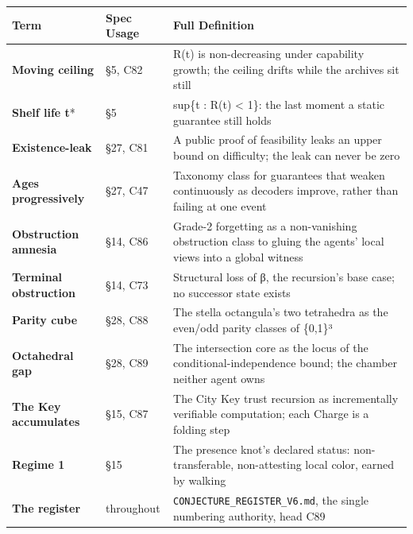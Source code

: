 \documentclass[
  11pt,
]{article}
\newcounter{none} %
\begin{document}
{\def\LTcaptype{none} %
\begin{longtable}[]{@{}
  >{\raggedright\arraybackslash}p{}
  >{\raggedright\arraybackslash}p{}
  >{\raggedright\arraybackslash}p{}@{}}
\toprule\noalign{}
\begin{minipage}[b]{\linewidth}\raggedright
Term
\end{minipage} & \begin{minipage}[b]{\linewidth}\raggedright
Spec Usage
\end{minipage} & \begin{minipage}[b]{\linewidth}\raggedright
Full Definition
\end{minipage} \\
\midrule\noalign{}
\endhead
\bottomrule\noalign{}
\endlastfoot
\textbf{Moving ceiling} & §5, C82 & R(t) is non-decreasing under
capability growth; the ceiling drifts while the archives sit still \\
\textbf{Shelf life t}* & §5 & sup\{t : R(t) \textless{} 1\}: the last
moment a static guarantee still holds \\
\textbf{Existence-leak} & §27, C81 & A public proof of feasibility leaks
an upper bound on difficulty; the leak can never be zero \\
\textbf{Ages progressively} & §27, C47 & Taxonomy class for guarantees
that weaken continuously as decoders improve, rather than failing at one
event \\
\textbf{Obstruction amnesia} & §14, C86 & Grade-2 forgetting as a
non-vanishing obstruction class to gluing the agents' local views into a
global witness \\
\textbf{Terminal obstruction} & §14, C73 & Structural loss of β, the
recursion's base case; no successor state exists \\
\textbf{Parity cube} & §28, C88 & The stella octangula's two tetrahedra
as the even/odd parity classes of \{0,1\}³ \\
\textbf{Octahedral gap} & §28, C89 & The intersection core as the locus
of the conditional-independence bound; the chamber neither agent owns \\
\textbf{The Key accumulates} & §15, C87 & The City Key trust recursion
as incrementally verifiable computation; each Charge is a folding
step \\
\textbf{Regime 1} & §15 & The presence knot's declared status:
non-transferable, non-attesting local color, earned by walking \\
\textbf{The register} & throughout &
\texttt{CONJECTURE\_REGISTER\_V6.md}, the single numbering authority,
head C89 \\
\end{longtable}
}
\end{document}
